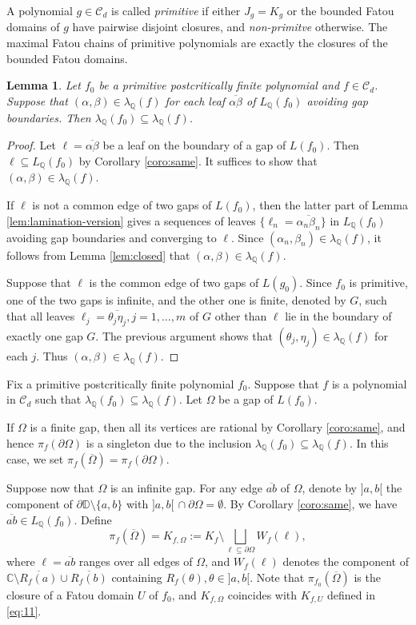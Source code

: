 \documentclass[a4paper,reqno,times, 11pt]{amsart}
\newtheorem{lemma}[theorem]{Lemma}
\theoremstyle{remark}
\theoremstyle{plain}
\numberwithin{equation}{section}
\def\CCCC{\mathscr C}
\def\C{\mbox{$\mathbb C$}}
\def\D{\mathbb D}
\def\Q{\mathbb Q}
\begin{document}
A polynomial $g\in\CCCC_d$ is called \emph{primitive} if either $J_g=K_g$ or the bounded Fatou domains of $g$ have pairwise disjoint closures, and \emph{non-primitve} otherwise. The maximal Fatou chains of primitive polynomials are exactly the closures of the bounded Fatou domains.

\begin{lemma}\label{lem:include}
Let $f_0$ be a primitive postcritically finite polynomial and $f\in\CCCC_d$. Suppose that $(\alpha,\beta)\in\lambda_\Q(f)$ for each leaf $\overline{\alpha\beta}$ of $L_\Q(f_0)$ avoiding gap boundaries. Then $\lambda_\Q(f_0)\subseteq \lambda_\Q(f)$.
\end{lemma}
\begin{proof}
Let $\ell=\overline{\alpha\beta}$ be a leaf on the boundary of a gap of $L(f_0)$. Then $\ell\subseteq L_\Q(f_0)$ by Corollary \ref{coro:same}. It suffices to show that $(\alpha,\beta)\in\lambda_\Q(f)$.

If $\ell$ is not a common edge of two gaps of $L(f_0)$, then the latter part of Lemma \ref{lem:lamination-version} gives a sequences of leaves $\{\ell_n=\overline{\alpha_n\beta_n}\}$ in $L_\Q(f_0)$ avoiding gap boundaries and converging to $\ell$. Since $(\alpha_n,\beta_n)\in\lambda_\Q(f)$, it follows from Lemma \ref{lem:closed}  that $(\alpha,\beta)\in \lambda_\Q(f)$.

Suppose that $\ell$ is the common edge of two gaps of $L(g_0)$. Since $f_0$ is primitive, one of the two gaps is infinite, and the other one is finite, denoted by $G$, such that all leaves $\ell_j=\overline{\theta_j\eta_j}, j=1,\ldots,m$ of $G$ other than $\ell$ lie in the boundary of exactly one gap $G$. The previous argument shows that $(\theta_j,\eta_j)\in\lambda_\Q(f)$ for each $j$. Thus $(\alpha,\beta)\in \lambda_\Q(f)$.
\end{proof}

	Fix a primitive postcritically finite polynomial $f_0$. Suppose that $f$ is a polynomial in $\CCCC_d$ such that $\lambda_\Q(f_0)\subseteq \lambda_\Q(f)$. Let $\Omega$ be a gap of $L(f_0)$.
	
	If $\Omega$ is a finite gap, then all its vertices are rational by Corollary \ref{coro:same}, and hence $\pi_f(\partial\Omega)$ is a singleton due to the inclusion  $\lambda_\Q(f_0)\subseteq \lambda_\Q(f)$. In this case, we set $\pi_f(\overline{\Omega})=\pi_f(\partial\Omega)$.
	
	Suppose now that $\Omega$ is an infinite gap. For any edge $\overline{ab}$ of $\Omega$, denote by $]a,b[$ the component of $\partial\D\setminus\{a,b\}$ with $]a,b[\,\cap \partial\Omega=\emptyset$. By Corollary \ref{coro:same}, we have $\overline{ab}\in L_\Q(f_0)$.
	Define
	\begin{equation}\label{eq:23}
		\pi_f(\overline{\Omega})=K_{f,\Omega}:= K_f\setminus \bigsqcup_{\ell\subseteq\partial \Omega}W_f(\ell),\end{equation}
	where $\ell=\overline{ab}$ ranges over all edges of $\Omega$, and $W_f(\ell)$ denotes the component of $\C\setminus\overline{R_f(a)}\cup\overline{R_f(b)}$ containing $R_f(\theta), \theta\in]a,b[$.
	Note that $\pi_{f_0}(\overline{\Omega})$ is the closure of a Fatou domain $U$ of $f_0$, and $K_{f,\Omega}$ coincides with $K_{f,U}$ defined in \eqref{eq:11}.
	
\end{document}
